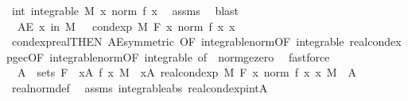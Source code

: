 \begin{isabellebody}
\ int{\isacharcolon}{\kern0pt}\ {\isachardoublequoteopen}integrable\ M\ {\isacharparenleft}{\kern0pt}{\isasymlambda}x{\isachardot}{\kern0pt}\ norm\ {\isacharparenleft}{\kern0pt}f\ x{\isacharparenright}{\kern0pt}{\isacharparenright}{\kern0pt}{\isachardoublequoteclose}\ \isamarkupfalse%
\ assms\ \isamarkupfalse%
\ blast\isanewline
\ \ \isamarkupfalse%
\ {\isacharasterisk}{\kern0pt}{\isacharcolon}{\kern0pt}\ {\isachardoublequoteopen}AE\ x\ in\ M{\isachardot}{\kern0pt}\ {}\ {\isasymle}\ cond{\isacharunderscore}{\kern0pt}exp\ M\ F\ {\isacharparenleft}{\kern0pt}{\isasymlambda}x{\isachardot}{\kern0pt}\ norm\ {\isacharparenleft}{\kern0pt}f\ x{\isacharparenright}{\kern0pt}{\isacharparenright}{\kern0pt}\ x{\isachardoublequoteclose}\ \isamarkupfalse%
\ cond{\isacharunderscore}{\kern0pt}exp{\isacharunderscore}{\kern0pt}real{\isacharbrackleft}{\kern0pt}THEN\ AE{\isacharunderscore}{\kern0pt}symmetric{\isacharcomma}{\kern0pt}\ OF\ integrable{\isacharunderscore}{\kern0pt}norm{\isacharbrackleft}{\kern0pt}OF\ integrable{\isacharbrackright}{\kern0pt}{\isacharbrackright}{\kern0pt}\ real{\isacharunderscore}{\kern0pt}cond{\isacharunderscore}{\kern0pt}exp{\isacharunderscore}{\kern0pt}ge{\isacharunderscore}{\kern0pt}c{\isacharbrackleft}{\kern0pt}OF\ integrable{\isacharunderscore}{\kern0pt}norm{\isacharbrackleft}{\kern0pt}OF\ integrable{\isacharbrackright}{\kern0pt}{\isacharcomma}{\kern0pt}\ of\ {}{\isacharbrackright}{\kern0pt}\ norm{\isacharunderscore}{\kern0pt}ge{\isacharunderscore}{\kern0pt}zero\ \isamarkupfalse%
\ fastforce\isanewline
\ \ \isamarkupfalse%
\ {\isacharasterisk}{\kern0pt}{\isacharasterisk}{\kern0pt}{\isacharcolon}{\kern0pt}\ {\isachardoublequoteopen}A\ {\isasymin}\ sets\ F\ {\isasymLongrightarrow}\ {\isasymintegral}x{\isasymin}A{\isachardot}{\kern0pt}\ {\isasymbar}f\ x{\isasymbar}\ {\isasympartial}M\ {\isacharequal}{\kern0pt}\ {\isasymintegral}x{\isasymin}A{\isachardot}{\kern0pt}\ real{\isacharunderscore}{\kern0pt}cond{\isacharunderscore}{\kern0pt}exp\ M\ F\ {\isacharparenleft}{\kern0pt}{\isasymlambda}x{\isachardot}{\kern0pt}\ norm\ {\isacharparenleft}{\kern0pt}f\ x{\isacharparenright}{\kern0pt}{\isacharparenright}{\kern0pt}\ x\ {\isasympartial}M{\isachardoublequoteclose}\ \ A\ \isamarkupfalse%
\ real{\isacharunderscore}{\kern0pt}norm{\isacharunderscore}{\kern0pt}def\ \isamarkupfalse%
\ assms\ integrable{\isacharunderscore}{\kern0pt}abs\ real{\isacharunderscore}{\kern0pt}cond{\isacharunderscore}{\kern0pt}exp{\isacharunderscore}{\kern0pt}intA\ \isamarkupfalse%

\end{isabellebody}
